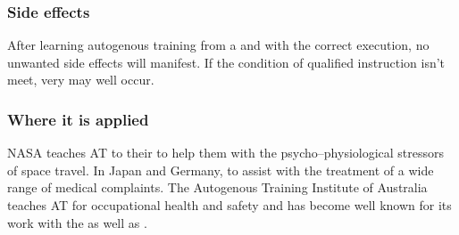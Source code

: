 \begin{frame}
\frametitle{Side effects}

After learning autogenous training from a  and with the correct execution, no unwanted side effects will manifest.
If the condition of qualified instruction isn't meet, very  may well occur.


\end{frame}

\begin{frame}
\frametitle{Where it is applied}

NASA teaches AT to their  to help them with the psycho--physiological stressors of space travel. In Japan and Germany,  to assist with the treatment of a wide range of medical complaints. The Autogenous Training Institute of Australia teaches AT for occupational health and safety and has become well known for its work with the  as well as . 



\end{frame}

